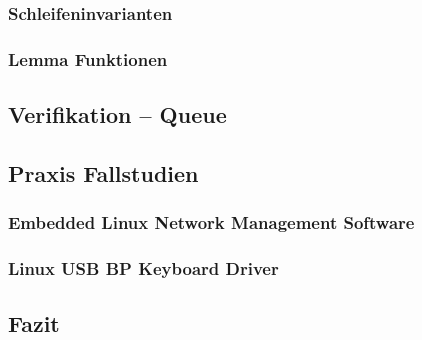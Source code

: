 \subsubsection{Schleifeninvarianten}

\subsubsection{Lemma Funktionen}

\subsection{Verifikation -- Queue}
\label{subsec:queue}

\subsection{Praxis Fallstudien}

\subsubsection{Embedded Linux Network Management Software}

\subsubsection{Linux USB BP Keyboard Driver}

\subsection{Fazit}